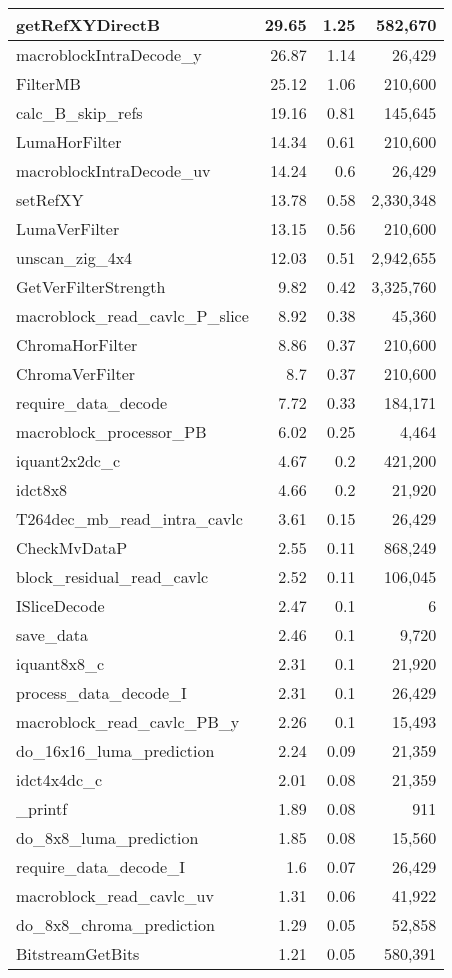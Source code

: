 \begin{longtable}[\textwidth]{lrrr}
    getRefXYDirectB & 29.65 & 1.25  & 582,670 \\ \hline
    macroblockIntraDecode\_y & 26.87 & 1.14  & 26,429 \\ \hline
    FilterMB & 25.12 & 1.06  & 210,600 \\ \hline
    calc\_B\_skip\_refs & 19.16 & 0.81  & 145,645 \\ \hline
    LumaHorFilter & 14.34 & 0.61  & 210,600 \\ \hline
    macroblockIntraDecode\_uv & 14.24 & 0.6   & 26,429 \\ \hline
    setRefXY & 13.78 & 0.58  & 2,330,348 \\ \hline
    LumaVerFilter & 13.15 & 0.56  & 210,600 \\ \hline
    unscan\_zig\_4x4 & 12.03 & 0.51  & 2,942,655 \\ \hline
    GetVerFilterStrength & 9.82  & 0.42  & 3,325,760 \\ \hline
    macroblock\_read\_cavlc\_P\_slice & 8.92  & 0.38  & 45,360 \\ \hline
    ChromaHorFilter & 8.86  & 0.37  & 210,600 \\ \hline
    ChromaVerFilter & 8.7   & 0.37  & 210,600 \\ \hline
    require\_data\_decode & 7.72  & 0.33  & 184,171 \\ \hline
    macroblock\_processor\_PB & 6.02  & 0.25  & 4,464 \\ \hline
    iquant2x2dc\_c & 4.67  & 0.2   & 421,200 \\ \hline
    idct8x8 & 4.66  & 0.2   & 21,920 \\ \hline
    T264dec\_mb\_read\_intra\_cavlc & 3.61  & 0.15  & 26,429 \\ \hline
    CheckMvDataP & 2.55  & 0.11  & 868,249 \\ \hline
    block\_residual\_read\_cavlc & 2.52  & 0.11  & 106,045 \\ \hline
    ISliceDecode & 2.47  & 0.1   & 6 \\ \hline
    save\_data & 2.46  & 0.1   & 9,720 \\ \hline
    iquant8x8\_c & 2.31  & 0.1   & 21,920 \\ \hline
    process\_data\_decode\_I & 2.31  & 0.1   & 26,429 \\ \hline
    macroblock\_read\_cavlc\_PB\_y & 2.26  & 0.1   & 15,493 \\ \hline
    do\_16x16\_luma\_prediction & 2.24  & 0.09  & 21,359 \\ \hline
    idct4x4dc\_c & 2.01  & 0.08  & 21,359 \\ \hline
    \_printf & 1.89  & 0.08  & 911 \\ \hline
    do\_8x8\_luma\_prediction & 1.85  & 0.08  & 15,560 \\ \hline
    require\_data\_decode\_I & 1.6   & 0.07  & 26,429 \\ \hline
    macroblock\_read\_cavlc\_uv & 1.31  & 0.06  & 41,922 \\ \hline
    do\_8x8\_chroma\_prediction & 1.29  & 0.05  & 52,858 \\ \hline
    BitstreamGetBits & 1.21  & 0.05  & 580,391 \\
    \bottomrule[1.5pt]
\end{longtable}

